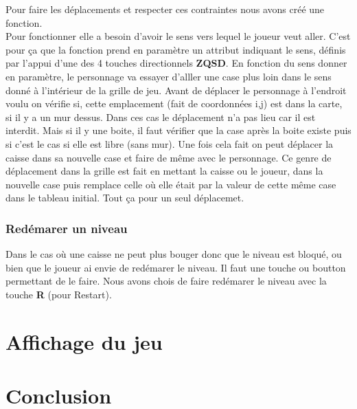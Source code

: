 \documentclass[french, 12pt]{article}
\begin{document}
        Pour faire les déplacements et respecter ces contraintes nous avons créé une {fonction}. \\
        Pour fonctionner elle a besoin d'avoir le sens vers lequel le joueur veut aller. C'est pour ça que la fonction prend en paramètre un attribut indiquant le sens, définis par l'appui d'une des 4 touches directionnels \textbf{ZQSD}. En fonction du sens donner en paramètre, le personnage va essayer d'alller une case plus loin dans le sens donné à l'intérieur de la grille de jeu. 
        Avant de déplacer le personnage à l'endroit voulu on vérifie si, cette emplacement (fait de coordonnées i,j) est dans la carte, si il y a un mur dessus. Dans ces cas le déplacement n'a pas lieu car il est interdit. Mais si il y une boite, il faut vérifier que la case après la boite existe puis si c'est le cas si elle est libre (sans mur). Une fois cela fait on peut déplacer la caisse dans sa nouvelle case et faire de même avec le personnage. Ce genre de déplacement dans la grille est fait en mettant la caisse ou le joueur, dans la nouvelle case puis remplace celle où elle était par la valeur de cette même case dans le {tableau initial}.
        Tout ça pour un seul déplacemet.

        \subsubsection{Redémarer un niveau}
        Dans le cas où une caisse ne peut plus bouger donc que le niveau est bloqué, ou bien que le joueur ai envie de redémarer le niveau. Il faut une touche ou boutton permettant de le faire. 
        Nous avons chois de faire redémarer le niveau avec la touche \textbf{R} (pour Restart).
        


\section{Affichage du jeu}

\section{Conclusion}
\end{document}
